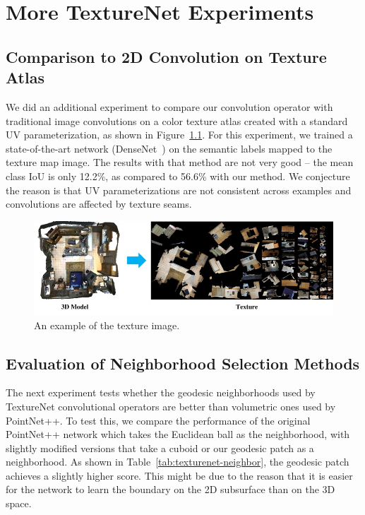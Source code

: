 \chapter{More TextureNet Experiments}
\section{Comparison to 2D Convolution on Texture Atlas}

We did an additional experiment to compare our convolution operator with traditional image convolutions on a color texture atlas created with a standard UV parameterization, as shown in Figure~\ref{fig:texturenet-textureimage}. For this experiment, we trained a state-of-the-art network (DenseNet~\cite{huang2017densely}) on the semantic labels mapped to the texture map image.  The results with that method are not very good -- the mean class IoU is only 12.2\%, as compared to 56.6\% with our method.  We conjecture the reason is that UV parameterizations are not consistent across examples and convolutions are affected by texture seams. 

\begin{figure}[h]
    \centering
    \includegraphics[width=\linewidth]{texturenet/diagram/texture.jpg}
    \caption{An example of the texture image.}
    \label{fig:texturenet-textureimage}
\end{figure}


\section{Evaluation of Neighborhood Selection Methods}

The next experiment tests whether the geodesic neighborhoods used by TextureNet convolutional operators are better than volumetric ones used by PointNet++.   To test this, we compare the performance of the original PointNet++ network which takes the Euclidean ball as the neighborhood, with slightly modified versions that take a cuboid or our geodesic patch as a neighborhood. As shown in Table~\ref{tab:texturenet-neighbor}, the geodesic patch achieves a slightly higher score. This might be due to the reason that it is easier for the network to learn the boundary on the 2D subsurface than on the 3D space.

